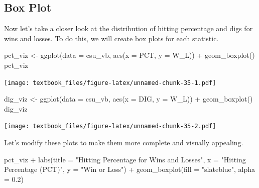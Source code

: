 \documentclass[
  11pt,
]{book}
\newenvironment{Shaded}{\begin{snugshade}}{\end{snugshade}}
\newcommand{\AttributeTok}[1]{\textcolor[rgb]{0.77,0.63,0.00}{#1}}
\newcommand{\FloatTok}[1]{\textcolor[rgb]{0.00,0.00,0.81}{#1}}
\newcommand{\FunctionTok}[1]{\textcolor[rgb]{0.00,0.00,0.00}{#1}}
\newcommand{\NormalTok}[1]{#1}
\newcommand{\OtherTok}[1]{\textcolor[rgb]{0.56,0.35,0.01}{#1}}
\newcommand{\SpecialCharTok}[1]{\textcolor[rgb]{0.00,0.00,0.00}{#1}}
\newcommand{\StringTok}[1]{\textcolor[rgb]{0.31,0.60,0.02}{#1}}
\theoremstyle{definition}
\theoremstyle{definition}
\theoremstyle{definition}
\theoremstyle{definition}
\theoremstyle{remark}
\begin{document}
\newpage

\hypertarget{box-plot}{%
\subsection{Box Plot}\label{box-plot}}

Now let's take a closer look at the distribution of hitting percentage and digs for wins and losses. To do this, we will create box plots for each statistic.

\begin{Shaded}
\begin{Highlighting}[]
\NormalTok{pct\_viz }\OtherTok{\textless{}{-}} \FunctionTok{ggplot}\NormalTok{(}\AttributeTok{data =}\NormalTok{ csu\_vb, }\FunctionTok{aes}\NormalTok{(}\AttributeTok{x =}\NormalTok{ PCT, }\AttributeTok{y =}\NormalTok{ W\_L)) }\SpecialCharTok{+}
  \FunctionTok{geom\_boxplot}\NormalTok{()}
\NormalTok{pct\_viz}
\end{Highlighting}
\end{Shaded}

\texttt{[image: textbook\_files/figure-latex/unnamed-chunk-35-1.pdf]}

\begin{Shaded}
\begin{Highlighting}[]
\NormalTok{dig\_viz }\OtherTok{\textless{}{-}} \FunctionTok{ggplot}\NormalTok{(}\AttributeTok{data =}\NormalTok{ csu\_vb, }\FunctionTok{aes}\NormalTok{(}\AttributeTok{x =}\NormalTok{ DIG, }\AttributeTok{y =}\NormalTok{ W\_L)) }\SpecialCharTok{+}
  \FunctionTok{geom\_boxplot}\NormalTok{()}
\NormalTok{dig\_viz}
\end{Highlighting}
\end{Shaded}

\texttt{[image: textbook\_files/figure-latex/unnamed-chunk-35-2.pdf]}
\newpage

Let's modify these plots to make them more complete and visually appealing.

\begin{Shaded}
\begin{Highlighting}[]
\NormalTok{pct\_viz }\SpecialCharTok{+}
  \FunctionTok{labs}\NormalTok{(}\AttributeTok{title =} \StringTok{"Hitting Percentage for Wins and Losses"}\NormalTok{,}
       \AttributeTok{x =} \StringTok{"Hitting Percentage (PCT)"}\NormalTok{,}
       \AttributeTok{y =} \StringTok{"Win or Loss"}\NormalTok{) }\SpecialCharTok{+}
  \FunctionTok{geom\_boxplot}\NormalTok{(}\AttributeTok{fill =} \StringTok{"slateblue"}\NormalTok{, }\AttributeTok{alpha =} \FloatTok{0.2}\NormalTok{)}
\end{Highlighting}
\end{Shaded}
\end{document}
